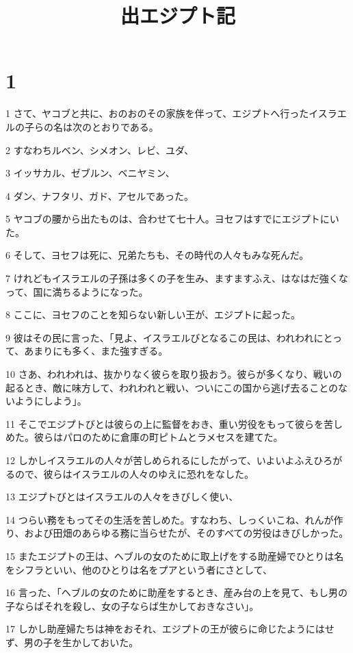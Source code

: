 

\title{出エジプト記}


\chapter{1}

\par 1 さて、ヤコブと共に、おのおのその家族を伴って、エジプトへ行ったイスラエルの子らの名は次のとおりである。
\par 2 すなわちルベン、シメオン、レビ、ユダ、
\par 3 イッサカル、ゼブルン、ベニヤミン、
\par 4 ダン、ナフタリ、ガド、アセルであった。
\par 5 ヤコブの腰から出たものは、合わせて七十人。ヨセフはすでにエジプトにいた。
\par 6 そして、ヨセフは死に、兄弟たちも、その時代の人々もみな死んだ。
\par 7 けれどもイスラエルの子孫は多くの子を生み、ますますふえ、はなはだ強くなって、国に満ちるようになった。
\par 8 ここに、ヨセフのことを知らない新しい王が、エジプトに起った。
\par 9 彼はその民に言った、「見よ、イスラエルびとなるこの民は、われわれにとって、あまりにも多く、また強すぎる。
\par 10 さあ、われわれは、抜かりなく彼らを取り扱おう。彼らが多くなり、戦いの起るとき、敵に味方して、われわれと戦い、ついにこの国から逃げ去ることのないようにしよう」。
\par 11 そこでエジプトびとは彼らの上に監督をおき、重い労役をもって彼らを苦しめた。彼らはパロのために倉庫の町ピトムとラメセスを建てた。
\par 12 しかしイスラエルの人々が苦しめられるにしたがって、いよいよふえひろがるので、彼らはイスラエルの人々のゆえに恐れをなした。
\par 13 エジプトびとはイスラエルの人々をきびしく使い、
\par 14 つらい務をもってその生活を苦しめた。すなわち、しっくいこね、れんが作り、および田畑のあらゆる務に当らせたが、そのすべての労役はきびしかった。
\par 15 またエジプトの王は、ヘブルの女のために取上げをする助産婦でひとりは名をシフラといい、他のひとりは名をプアという者にさとして、
\par 16 言った、「ヘブルの女のために助産をするとき、産み台の上を見て、もし男の子ならばそれを殺し、女の子ならば生かしておきなさい」。
\par 17 しかし助産婦たちは神をおそれ、エジプトの王が彼らに命じたようにはせず、男の子を生かしておいた。
